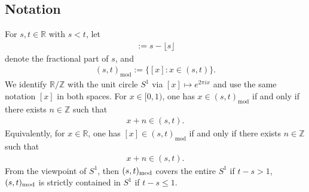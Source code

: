 \documentclass[12pt]{amsart}
\theoremstyle{plain}
\theoremstyle{definition}
\begin{document}
\subsection*{Notation}

For $s,t\in\mathbb R$ with $s<t$, let
\begin{align}
	[s]:=s-\lfloor s\rfloor
	\label{demodx}
\end{align}denote the fractional part of $s$,
and
\begin{align}
	(s,t)_{\mathrm{mod}}:=\{[x]:x\in(s,t)\}.
	\label{demodint}
\end{align}
We identify $\mathbb R/\mathbb Z$ with the unit circle $S^1$ via
$[x]\mapsto e^{2\pi i x}$ and use the same notation $[x]$ in both
spaces. For $x\in[0,1)$, one has $x\in(s,t)_{\mathrm{mod}}$ if and only
if there exists $n\in\mathbb Z$ such that
\begin{align}
	x+n\in(s,t).
	\label{equstmod}
\end{align}
Equivalently, for $x\in\mathbb R$, one has
$[x]\in(s,t)_{\mathrm{mod}}$ if and only if there exists
$n\in\mathbb Z$ such that
\begin{align}
	x+n\in(s,t).
	\label{equmodr}
\end{align}
From the viewpoint of $S^1$, then $(s,t)_{\rm{mod}}$ covers the entire $S^1$ if $t-s>1$, $(s,t)_{\rm{mod}}$ is strictly contained in $S^1$ if $t-s\leq 1$.
\end{document}
